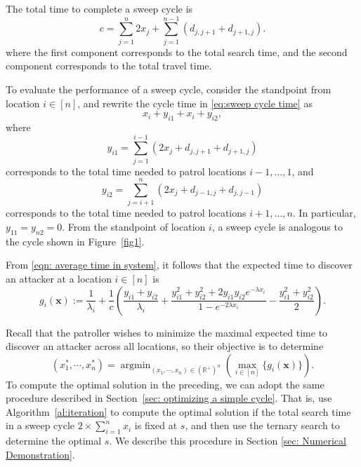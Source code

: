 \documentclass[11pt,a4paper]{article}
\DeclareMathOperator*{\argmin}{argmin}
\newcommand{\kyle}[1]{{\color{orange}#1}}
\begin{document}
The total time to complete a sweep cycle is
\begin{equation}
c = \sum_{j=1}^{n} 2x_j + \sum_{j=1}^{n-1} \left( d_{j,j+1} + d_{j+1,j} \right).
\label{eq:sweep cycle time}
\end{equation}
where the first component corresponds to the total search time, and the second component corresponds to the total travel time.

To evaluate the performance of a sweep cycle, consider the standpoint from location $i \in [n]$, and rewrite the cycle time in \eqref{eq:sweep cycle time} as
\[
x_i + y_{i1} + x_i + y_{i2},
\]
where
\[
y_{i1} = \sum_{j=1}^{i-1} (2x_j +  d_{j,j+1} + d_{j+1,j} )
\]
corresponds to the total time needed to patrol locations $i-1, \ldots, 1$, and
\[
y_{i2} = \sum_{j=i+1}^n (2x_j +  d_{j-1,j} + d_{j,j-1}) 
\]
corresponds to the total time needed to patrol locations $i+1, \ldots, n$.
In particular, $y_{11} = y_{n2} = 0$.
From the standpoint of location $i$, a sweep cycle is analogous to the cycle shown in Figure~\ref{fig1}.

From \eqref{eqn: average time in system}, it follows that the expected time to discover an attacker at a location $i \in [n]$ is
\begin{equation} \label{eqn: sweep cycle}
    g_i(\textbf{x}) := \frac{1}{\lambda_i} + \frac{1}{c} \left(
\frac{y_{i1} + y_{i2}}{\lambda_i} + \frac{ 
y_{i1}^2 + y_{i2}^2 + 2y_{i1} y_{i2} e^{-\lambda x_i }  }{1-e^{-2\lambda x_i}} - \frac{y_{i1}^2 +y_{i2}^2}{2}
\right).
\end{equation}

Recall that the patroller wishes to minimize the maximal expected time to discover an attacker across all locations, so their objective is to determine
\[
(x_1^*,\cdots,x_n^*) = \argmin_{(x_1,\cdots,x_n) \in (\mathbb{R}^+)^n} \left( \max_{i \in [n]} \{ g_i(\textbf{x}) \} \right).
\]
To compute the optimal solution in the preceding, we can adopt the same procedure described in Section~\ref{sec: optimizing a simple cycle}.
That is, use Algorithm~\ref{al:iteration} to compute the optimal solution if the total search time in a sweep cycle $2 \times \sum_{i=1}^n x_i$ is fixed at $s$, and then use the ternary search to determine the optimal $s$.
We describe this procedure in Section \ref{sec: Numerical Demonstration}.

\end{document}
